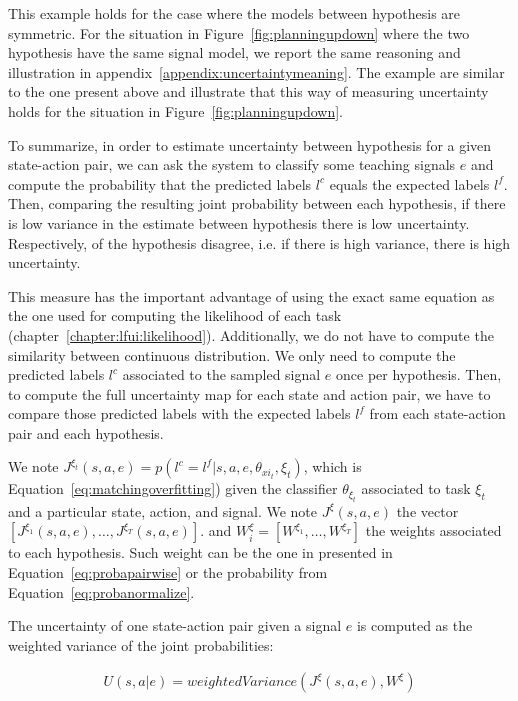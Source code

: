 This example holds for the case where the models between hypothesis are symmetric. For the situation in Figure~\ref{fig:planningupdown} where the two hypothesis have the same signal model, we report the same reasoning and illustration in appendix~\ref{appendix:uncertaintymeaning}. The example are similar to the one present above and illustrate that this way of measuring uncertainty holds for the situation in Figure~\ref{fig:planningupdown}.

To summarize, in order to estimate uncertainty between hypothesis for a given state-action pair, we can ask the system to classify some teaching signals $e$ and compute the probability that the predicted labels $l^c$ equals the expected labels $l^f$. Then, comparing the resulting joint probability between each hypothesis, if there is low variance in the estimate between hypothesis there is low uncertainty. Respectively, of the hypothesis disagree, i.e. if there is high variance, there is high uncertainty. 

This measure has the important advantage of using the exact same equation as the one used for computing the likelihood of each task (chapter~\ref{chapter:lfui:likelihood}). Additionally, we do not have to compute the similarity between continuous distribution. We only need to compute the predicted labels $l^c$ associated to the sampled signal $e$ once per hypothesis. Then, to compute the full uncertainty map for each state and action pair, we have to compare those predicted labels with the expected labels $l^f$ from each state-action pair and each hypothesis.

We note $J^{\xi_t}(s,a,e) = p(l^c = l^f | s, a, e, \theta_{xi_t}, \xi_t)$, which is Equation~\ref{eq:matchingoverfitting}) given the classifier $\theta_{\xi_t}$ associated to task $\xi_t$ and a particular state, action, and signal. We note $J^{\xi}(s,a,e)$ the vector $[J^{\xi_1}(s,a,e), \ldots, J^{\xi_T}(s,a,e)]$. and $W_{i}^{\xi} = [W^{\xi_1}, \ldots, W^{\xi_T}]$ the weights associated to each hypothesis. Such weight can be the one in presented in Equation~\ref{eq:probapairwise} or the probability from Equation~\ref{eq:probanormalize}.

The uncertainty of one state-action pair given a signal $e$ is computed as the weighted variance of the joint probabilities:

\begin{eqnarray}
U(s,a|e) = weightedVariance(J^{\xi}(s,a,e), W^{\xi})
\label{eq:planningOneSignal}
\end{eqnarray}


